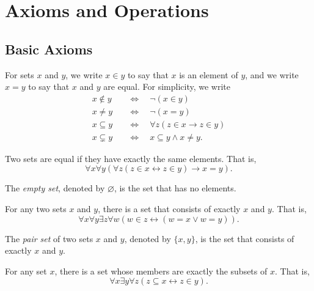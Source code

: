 \chapter{Axioms and Operations}
\section{Basic Axioms}
For sets $x$ and $y$, we write $x \in y$ to say that $x$ is an element of
$y$, and we write $x = y$ to say that $x$ and $y$ are equal.
For simplicity, we write
\begin{align*}
  x \notin y \quad &\Leftrightarrow \quad \neg(x \in y) \\
  x \neq y \quad &\Leftrightarrow \quad \neg(x = y) \\
  x \subseteq y \quad &\Leftrightarrow \quad \forall z (z \in x \to z \in y) \\
  x \subsetneq y \quad &\Leftrightarrow \quad x \subseteq y \wedge x \neq y.
\end{align*}

\begin{axiom}[Extensionality]
  Two sets are equal if they have exactly the same elements.
  That is,
  \begin{equation*}
    \forall x \forall y (\forall z (z \in x \leftrightarrow z \in y) \to
    x = y).
  \end{equation*}
\end{axiom}

\begin{definition}
  The \emph{empty set}, denoted by $\varnothing$, is the set that has no
  elements.
\end{definition}

\begin{axiom}[Pairing]
  For any two sets $x$ and $y$, there is a set that consists of exactly $x$ and
  $y$.
  That is,
  \begin{equation*}
    \forall x \forall y \exists z \forall w (w \in z \leftrightarrow
    (w = x \vee w = y)).
  \end{equation*}
\end{axiom}

\begin{definition}
  The \emph{pair set} of two sets $x$ and $y$, denoted by $\{x, y\}$, is the
  set that consists of exactly $x$ and $y$.
\end{definition}

\begin{axiom}
  For any set $x$, there is a set whose members are exactly the subsets
  of $x$.
  That is,
  \begin{equation*}
    \forall x \exists y \forall z (z \subseteq x \leftrightarrow z \in y).
  \end{equation*}
\end{axiom}

